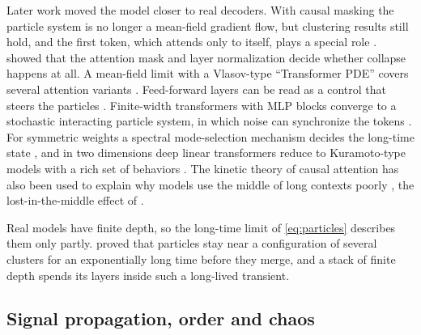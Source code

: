 Later work moved the model closer to real decoders. With causal masking the particle system is no longer a mean-field gradient flow, but clustering results still hold, and the first token, which attends only to itself, plays a special role \citep{karagodin2024clustering}. \citet{wu2024role} showed that the attention mask and layer normalization decide whether collapse happens at all. A mean-field limit with a Vlasov-type ``Transformer PDE'' covers several attention variants \citep{castin2025unified}. Feed-forward layers can be read as a control that steers the particles \citep{maranzatto2026role}. Finite-width transformers with MLP blocks converge to a stochastic interacting particle system, in which noise can synchronize the tokens \citep{agazzi2026stochastic}. For symmetric weights a spectral mode-selection mechanism decides the long-time state \citep{kuehn2026spectral}, and in two dimensions deep linear transformers reduce to Kuramoto-type models with a rich set of behaviors \citep{li2026diverse}. The kinetic theory of causal attention has also been used to explain why models use the middle of long contexts poorly \citep{duerinckx2026kinetic}, the lost-in-the-middle effect of \citet{liu2023lost}.

Real models have finite depth, so the long-time limit of \eqref{eq:particles} describes them only partly. \citet{geshkovski2024dynamic} proved that particles stay near a configuration of several clusters for an exponentially long time before they merge, and a stack of finite depth spends its layers inside such a long-lived transient.

\subsection{Signal propagation, order and chaos}
\label{sec:edgechaos}

